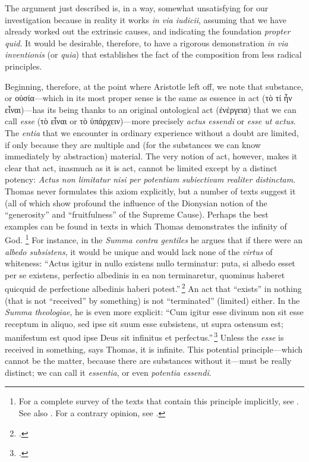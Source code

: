 The argument just described is, in a way, somewhat unsatisfying for our investigation because in reality it works \emph{in via iudicii}, assuming that we have already worked out the extrinsic causes, and indicating the foundation \emph{propter quid}. It would be desirable, therefore, to have a rigorous demonstration \emph{in via inventionis} (or \emph{quia}) that establishes the fact of the composition from less radical principles. 

Beginning, therefore, at the point where Aristotle left off, we note that substance, or οὐσία—which in its most proper sense is the same as essence in act (τὸ τί ἦν εἶναι)—has its being thanks to an original ontological act (ἐνέργεια) that we can call \emph{esse} (τὸ εἶναι or τὸ ὑπάρχειν)—more precisely \emph{actus essendi} or \emph{esse ut actus}. The \emph{entia} that we encounter in ordinary experience without a doubt are limited, if only because they are multiple and (for the substances we can know immediately by abstraction) material. The very notion of act, however, makes it clear that act, inasmuch as it is act, cannot be limited except by a distinct potency: \emph{Actus non limitatur nisi per potentiam subiectivam realiter distinctam}. Thomas never formulates this axiom explicitly, but a number of texts suggest it (all of which show profound the influence of the Dionysian notion of the “generosity” and “fruitfulness” of the Supreme Cause). Perhaps the best examples can be found in texts in which Thomas demonstrates the infinity of God.%
%
\footnote{For a complete survey of the texts that contain this principle implicitly, see \cite[Chapter V, “Thomas Aquinas and the Axiom that Unreceived Act Is Unlimited”, 123–151]{wippel:metaphysical_themes_2}.
See also \cite[51-56]{definance:etre-et-agir}.
For a contrary opinion, see \cite{robert:principe}.}
%
For instance, in the \emph{Summa contra gentiles} he argues that if there were an \emph{albedo subsistens}, it would be unique and would lack none of the \emph{virtus} of whiteness:
“Actus igitur in nullo existens nullo terminatur: puta, si albedo esset per se existens, perfectio albedinis in ea non terminaretur, quominus haberet quicquid de perfectione albedinis haberi potest.”\,\footcite[I, cap.~43, n.~5 (Marietti n.~360)]{st:contragent}
An act that “exists” in nothing (that is not “received” by something) is not “terminated” (limited) either. In the \emph{Summa theologiae}, he is even more explicit:
“Cum igitur esse divinum non sit esse receptum in aliquo, sed ipse sit suum esse subsistens, ut supra ostensum est; manifestum est quod ipse Deus sit infinitus et perfectus.”\,\footcite[I, q.~7, a.~1, co.]{st:summa}
Unless the \emph{esse} is received in something, says Thomas, it is infinite. This potential principle—which cannot be the matter, because there are substances without it—must be really distinct; we can call it \emph{essentia}, or even \emph{potentia essendi}.

